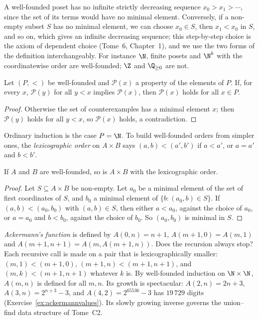 A well-founded poset has no infinite strictly decreasing sequence $x_0>x_1>\cdots$, since the set of its terms would have no
minimal element. Conversely, if a non-empty subset $S$ has no minimal element, we can choose $x_0\in S$, then $x_1<x_0$ in $S$, and so
on, which gives an infinite decreasing sequence; this step-by-step choice is the axiom of dependent choice (Tome~6,
Chapter~1), and we use the two forms of the definition interchangeably. For instance $\N$, finite posets and $\N^k$ with
the coordinatewise order are well-founded; $\Z$ and $\Q_{\ge0}$ are not.

\begin{theorem}\label{thm:wfind}
Let $(P,<)$ be well-founded and $\mathcal P(x)$ a property of the elements of $P$. If, for every $x$, $\mathcal P(y)$ for all $y<x$ implies $\mathcal P(x)$,
then $\mathcal P(x)$ holds for all $x\in P$.
\end{theorem}
\begin{proof}
Otherwise the set of counterexamples has a minimal element $x$; then $\mathcal P(y)$ holds for all $y<x$, so $\mathcal P(x)$ holds, a
contradiction.
\end{proof}

Ordinary induction is the case $P=\N$. To build well-founded orders from simpler ones, the \emph{lexicographic order} on $A\times B$
says $(a,b)<(a',b')$ if $a<a'$, or $a=a'$ and $b<b'$.

\begin{proposition}\label{prop:lex}
If $A$ and $B$ are well-founded, so is $A\times B$ with the lexicographic order.
\end{proposition}
\begin{proof}
Let $S\subseteq A\times B$ be non-empty. Let $a_0$ be a minimal element of the set of first coordinates of $S$, and $b_0$ a minimal element of
$\{b:(a_0,b)\in S\}$. If $(a,b)<(a_0,b_0)$ with $(a,b)\in S$, then either $a<a_0$, against the choice of $a_0$, or $a=a_0$ and $b<b_0$, against the choice of $b_0$.
So $(a_0,b_0)$ is minimal in $S$.
\end{proof}

\begin{example}\label{ex:ackermann}
\emph{Ackermann's function} is defined by $A(0,n)=n+1$, $A(m+1,0)=A(m,1)$ and $A(m+1,n+1)=A(m,A(m+1,n))$. Does the recursion
always stop? Each recursive call is made on a pair that is lexicographically smaller: $(m,1)<(m+1,0)$, $(m+1,n)<(m+1,n+1)$,
and $(m,k)<(m+1,n+1)$ whatever $k$ is. By well-founded induction on $\N\times\N$, $A(m,n)$ is defined for all $m,n$. Its growth is
spectacular: $A(2,n)=2n+3$, $A(3,n)=2^{n+3}-3$, and $A(4,2)=2^{65536}-3$ has $19\,729$ digits (Exercise~\ref{ex:ackermannvalues}). Its slowly
growing inverse governs the union--find data structure of Tome~C2.
\end{example}

